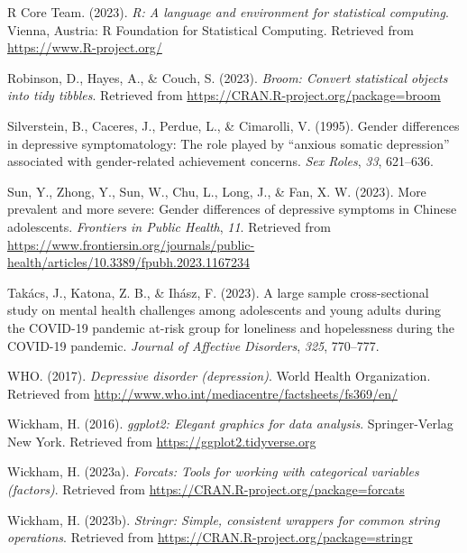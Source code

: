\documentclass[
  man,floatsintext]{apa6}
\newlength{\cslhangindent}
\newlength{\cslentryspacingunit} %
\newenvironment{CSLReferences}[2] %
 {%
  \setlength{\parindent}{0pt}
  \ifodd #1
  \let\oldpar\par
  \def\par{\hangindent=\cslhangindent\oldpar}
  \fi
  \setlength{\parskip}{#2\cslentryspacingunit}
 }%
 {}
\begin{document}
\begin{CSLReferences}{1}{0}
\leavevmode{}%
R Core Team. (2023). \emph{R: A language and environment for statistical computing}. Vienna, Austria: R Foundation for Statistical Computing. Retrieved from \url{https://www.R-project.org/}

\leavevmode{}%
Robinson, D., Hayes, A., \& Couch, S. (2023). \emph{Broom: Convert statistical objects into tidy tibbles}. Retrieved from \url{https://CRAN.R-project.org/package=broom}

\leavevmode{}%
Silverstein, B., Caceres, J., Perdue, L., \& Cimarolli, V. (1995). Gender differences in depressive symptomatology: The role played by {``anxious somatic depression''} associated with gender-related achievement concerns. \emph{Sex Roles}, \emph{33}, 621--636.

\leavevmode{}%
Sun, Y., Zhong, Y., Sun, W., Chu, L., Long, J., \& Fan, X. W. (2023). More prevalent and more severe: Gender differences of depressive symptoms in {Chinese} adolescents. \emph{Frontiers in Public Health}, \emph{11}. Retrieved from \url{https://www.frontiersin.org/journals/public-health/articles/10.3389/fpubh.2023.1167234}

\leavevmode{}%
Takács, J., Katona, Z. B., \& Ihász, F. (2023). A large sample cross-sectional study on mental health challenges among adolescents and young adults during the COVID-19 pandemic at-risk group for loneliness and hopelessness during the COVID-19 pandemic. \emph{Journal of Affective Disorders}, \emph{325}, 770--777.

\leavevmode{}%
WHO. (2017). \emph{Depressive disorder (depression)}. World Health Organization. Retrieved from \url{http://www.who.int/mediacentre/factsheets/fs369/en/}

\leavevmode{}%
Wickham, H. (2016). \emph{ggplot2: Elegant graphics for data analysis}. Springer-Verlag New York. Retrieved from \url{https://ggplot2.tidyverse.org}

\leavevmode{}%
Wickham, H. (2023a). \emph{Forcats: Tools for working with categorical variables (factors)}. Retrieved from \url{https://CRAN.R-project.org/package=forcats}

\leavevmode{}%
Wickham, H. (2023b). \emph{Stringr: Simple, consistent wrappers for common string operations}. Retrieved from \url{https://CRAN.R-project.org/package=stringr}


\end{CSLReferences}
\end{document}
